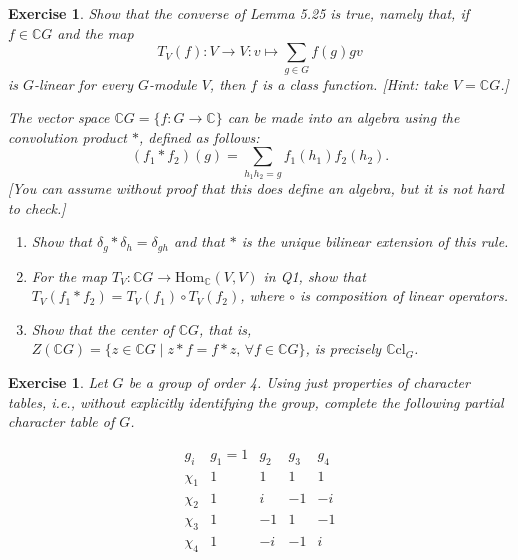 \documentclass{article}
\newtheorem{exercise}[theorem]{Exercise}
\begin{document}
\begin{exercise}
 Show that the converse of Lemma 5.25 is true, namely that, if \( f \in \mathbb{C}G \) and the map
    \[
    T_V(f) : V \to V : v \mapsto \sum_{g \in G} f(g)gv
    \]
    is \( G \)-linear for every \( G \)-module \( V \), then \( f \) is a class function. [Hint: take \( V = \mathbb{C}G \).]
    
    \item The vector space \( \mathbb{C}G = \{ f : G \to \mathbb{C} \} \) can be made into an algebra using the convolution product \( * \), defined as follows:
    \[
    (f_1 * f_2)(g) = \sum_{h_1h_2 = g} f_1(h_1)f_2(h_2).
    \]
    [You can assume without proof that this does define an algebra, but it is not hard to check.]

    \begin{enumerate}
        \item Show that \( \delta_g * \delta_h = \delta_{gh} \) and that \( * \) is the unique bilinear extension of this rule.
        \item For the map \( T_V : \mathbb{C}G \to \text{Hom}_{\mathbb{C}}(V, V) \) in Q1, show that \( T_V(f_1 * f_2) = T_V(f_1) \circ T_V(f_2) \), where \( \circ \) is composition of linear operators.
        \item Show that the center of \( \mathbb{C}G \), that is, \( Z(\mathbb{C}G) = \{ z \in \mathbb{C}G \mid z * f = f * z, \, \forall f \in \mathbb{C}G \} \), is precisely \( \mathbb{C} \text{cl}_G \).
    \end{enumerate}
\end{exercise}
\begin{exercise}
    Let \( G \) be a group of order 4. Using just properties of character tables, i.e., without explicitly identifying the group, complete the following partial character table of \( G \).

    \[
    \begin{array}{c|cccc}
    g_i & g_1 = 1 & g_2 & g_3 & g_4 \\
    \hline
    \chi_1 & 1 & 1 & 1 & 1 \\
    \chi_2 & 1 & i & -1 & -i \\
    \chi_3 & 1 & -1 & 1 & -1 \\
    \chi_4 & 1 & -i & -1 & i \\
    \end{array}
    \]
\end{exercise}
\end{document}
